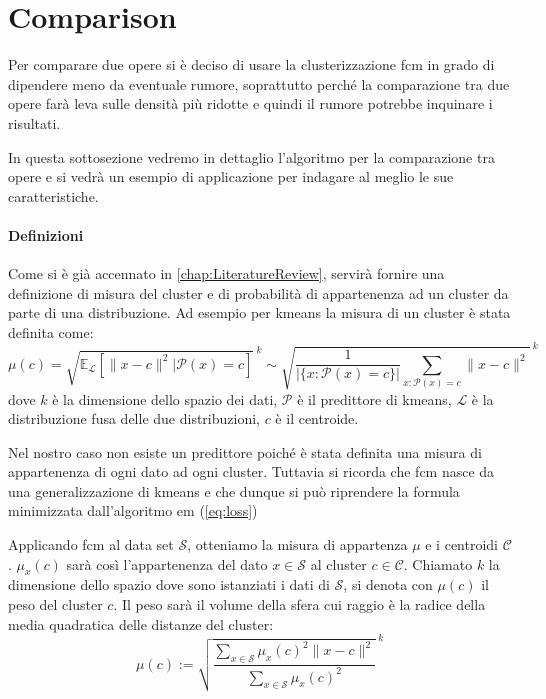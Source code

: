 \section{Comparison}
Per comparare due opere si è deciso di usare la clusterizzazione \gls{fcm} in grado di dipendere meno da eventuale rumore, soprattutto perché la comparazione tra due opere farà leva sulle densità più ridotte e quindi il rumore potrebbe inquinare i risultati.

\noindent In questa sottosezione vedremo in dettaglio l'algoritmo per la comparazione tra opere e si vedrà un esempio di applicazione per indagare al meglio le sue caratteristiche.

\paragraph{Definizioni}
Come si è già accennato in \cref{chap:LiteratureReview}, servirà fornire una definizione di misura del cluster e di probabilità di appartenenza ad un cluster da parte di una distribuzione. Ad esempio per \gls{kmeans} la misura di un cluster è stata definita come:
\begin{equation*}
	\mu(c) = {\sqrt{\mathbb{E}_\mathcal{L}\left[\|x-c\|^2|\mathcal{P}(x)=c\right]}\,}^{k} \sim {\sqrt{\frac{1}{|\{x:\mathcal{P}(x)=c\}|}\sum_{x:\mathcal{P}(x)=c}\|x-c\|^2}\,}^{k}
\end{equation*}
dove $k$ è la dimensione dello spazio dei dati, $\mathcal{P}$ è il predittore di \gls{kmeans}, $\mathcal{L}$ è la distribuzione fusa delle due distribuzioni, $c$ è il centroide.

\noindent Nel nostro caso non esiste un predittore poiché è stata definita una misura di appartenenza di ogni dato ad ogni cluster. Tuttavia si ricorda che \gls{fcm} nasce da una generalizzazione di \gls{kmeans} e che dunque si può riprendere la formula minimizzata dall'algoritmo \gls{em} (\cref{eq:loss})
\begin{definition}
\label{def:cluster_measure}
	Applicando \gls{fcm} al data set $\mathcal{S}$, otteniamo la misura di appartenza $\mu$ e i centroidi $\mathcal{C}$. $\mu_x(c)$ sarà così l'appartenenza del dato $x\in\mathcal{S}$ al cluster $c\in\mathcal{C}$. Chiamato $k$ la dimensione dello spazio dove sono istanziati i dati di $\mathcal{S}$, si denota con $\mu(c)$ il peso del cluster $c$. Il peso sarà il volume della sfera cui raggio è la radice della media quadratica delle distanze del cluster:
	\begin{equation}
		\mu(c) := {\sqrt{\frac{\sum_{x\in\mathcal{S}} \mu_x(c)^2 \|x-c\|^2}{\sum_{x\in\mathcal{S}}\mu_x(c)^2}}\,}^k
		\label{eq:fcm_cluster_measure}
	\end{equation}
\end{definition}

